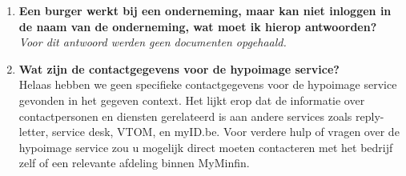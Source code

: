 \begin{enumerate}
    \item \textbf{Een burger werkt bij een onderneming, maar kan niet inloggen in de naam van de onderneming, wat moet ik hierop antwoorden?} \\
    \textit{Voor dit antwoord werden geen documenten opgehaald.}
    
    \item \textbf{Wat zijn de contactgegevens voor de hypoimage service?} \\
    Helaas hebben we geen specifieke contactgegevens voor de hypoimage service gevonden in het gegeven context. Het lijkt erop dat de informatie over contactpersonen en diensten gerelateerd is aan andere services zoals reply-letter, service desk, VTOM, en myID.be. Voor verdere hulp of vragen over de hypoimage service zou u mogelijk direct moeten contacteren met het bedrijf zelf of een relevante afdeling binnen MyMinfin.
    
\end{enumerate}

